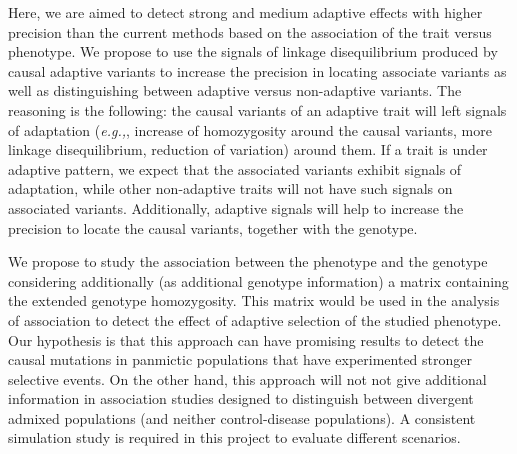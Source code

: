 \documentclass[a4paper,11pt]{article}
\begin{document}
Here, we are aimed to detect strong and medium adaptive effects with higher precision than the current methods based on the association of the trait versus phenotype. We propose to use the signals of linkage disequilibrium produced by causal adaptive variants to increase the precision in locating associate variants as well as distinguishing  between adaptive versus non-adaptive variants. The reasoning is the following: the causal variants of an adaptive trait will left signals of adaptation (\textit{e.g.,}, increase of homozygosity around the causal variants, more linkage disequilibrium, reduction of variation) around them. If a trait is under adaptive pattern, we expect that the associated variants exhibit signals of adaptation, while other non-adaptive traits will not have such signals on associated variants. Additionally, adaptive signals will help to increase the precision to locate the causal variants, together with the genotype. 

We propose to study the association between the phenotype and the genotype considering  additionally (as additional genotype information)  a matrix containing the extended genotype homozygosity.  This matrix would be used in the analysis of association to detect the effect of adaptive selection of the studied phenotype. %
Our hypothesis is that this approach can have  promising results to detect the causal mutations in panmictic populations that have experimented stronger selective events. On the other hand, this approach will not not give additional information in association studies designed to distinguish between divergent admixed populations (and neither control-disease populations). A consistent simulation study is required in this project to evaluate different scenarios.
\end{document}
